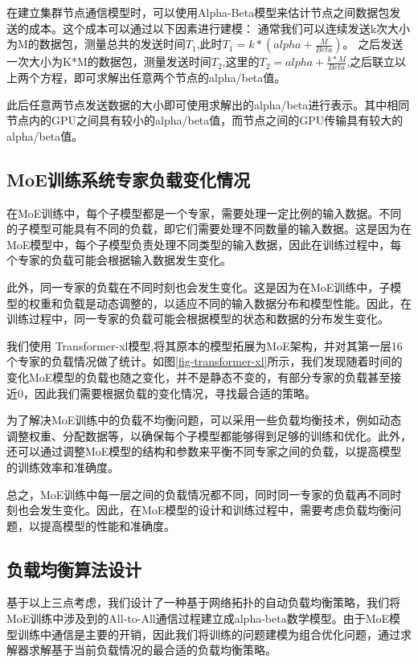 在建立集群节点通信模型时，可以使用Alpha-Beta模型来估计节点之间数据包发送的成本。这个成本可以通过以下因素进行建模：
通常我们可以连续发送k次大小为M的数据包，测量总共的发送时间${T_1}$,此时${T_1 = k * (alpha + \frac{M}{Beta})}$。
% 
之后发送一次大小为K*M的数据包，测量发送时间${T_2}$,这里的${T_2} = alpha + \frac{k * M}{Beta}$,之后联立以上两个方程，即可求解出任意两个节点的alpha/beta值。

此后任意两节点发送数据的大小即可使用求解出的alpha/beta进行表示。其中相同节点内的GPU之间具有较小的alpha/beta值，而节点之间的GPU传输具有较大的alpha/beta值。

\subsection{MoE训练系统专家负载变化情况}

在MoE训练中，每个子模型都是一个专家，需要处理一定比例的输入数据。不同的子模型可能具有不同的负载，即它们需要处理不同数量的输入数据。这是因为在MoE模型中，每个子模型负责处理不同类型的输入数据，因此在训练过程中，每个专家的负载可能会根据输入数据发生变化。

此外，同一专家的负载在不同时刻也会发生变化。这是因为在MoE训练中，子模型的权重和负载是动态调整的，以适应不同的输入数据分布和模型性能。因此，在训练过程中，同一专家的负载可能会根据模型的状态和数据的分布发生变化。


我们使用 Transformer-xl模型,将其原本的模型拓展为MoE架构，并对其第一层16个专家的负载情况做了统计。如图\ref{fig-transformer-xl}所示，我们发现随着时间的变化MoE模型的负载也随之变化，并不是静态不变的，有部分专家的负载甚至接近0，因此我们需要根据负载的变化情况，寻找最合适的策略。

为了解决MoE训练中的负载不均衡问题，可以采用一些负载均衡技术，例如动态调整权重、分配数据等，以确保每个子模型都能够得到足够的训练和优化。此外，还可以通过调整MoE模型的结构和参数来平衡不同专家之间的负载，以提高模型的训练效率和准确度。

总之，MoE训练中每一层之间的负载情况都不同，同时同一专家的负载再不同时刻也会发生变化。因此，在MoE模型的设计和训练过程中，需要考虑负载均衡问题，以提高模型的性能和准确度。

\subsection{负载均衡算法设计}

基于以上三点考虑，我们设计了一种基于网络拓扑的自动负载均衡策略，我们将MoE训练中涉及到的All-to-All通信过程建立成alpha-beta数学模型。由于MoE模型训练中通信是主要的开销，因此我们将训练的问题建模为组合优化问题，通过求解器求解基于当前负载情况的最合适的负载均衡策略。

